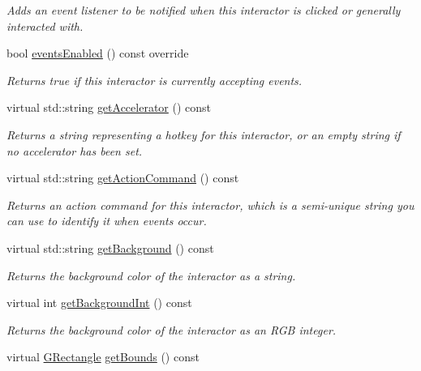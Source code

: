 \begin{DoxyCompactItemize}
\begin{DoxyCompactList}\small\item\em Adds an event listener to be notified when this interactor is clicked or generally interacted with. \end{DoxyCompactList}\item 
bool \mbox{\hyperlink{classsgl_1_1GInteractor_a597a370b592e3737d38d9d2f4e2031ea}{events\+Enabled}} () const override
\begin{DoxyCompactList}\small\item\em Returns true if this interactor is currently accepting events. \end{DoxyCompactList}\item 
virtual std\+::string \mbox{\hyperlink{classsgl_1_1GInteractor_a69f8d23ed8f207fbecad99960776e942}{get\+Accelerator}} () const
\begin{DoxyCompactList}\small\item\em Returns a string representing a hotkey for this interactor, or an empty string if no accelerator has been set. \end{DoxyCompactList}\item 
virtual std\+::string \mbox{\hyperlink{classsgl_1_1GInteractor_a94eb4276000c4fdfb508ce9e6317a82a}{get\+Action\+Command}} () const
\begin{DoxyCompactList}\small\item\em Returns an action command for this interactor, which is a semi-\/unique string you can use to identify it when events occur. \end{DoxyCompactList}\item 
virtual std\+::string \mbox{\hyperlink{classsgl_1_1GInteractor_a808e22cc1fdfbecf71ed8c64ef4600e0}{get\+Background}} () const
\begin{DoxyCompactList}\small\item\em Returns the background color of the interactor as a string. \end{DoxyCompactList}\item 
virtual int \mbox{\hyperlink{classsgl_1_1GInteractor_a9e827257a55cb8cf4d9de2ec6bcfd7a0}{get\+Background\+Int}} () const
\begin{DoxyCompactList}\small\item\em Returns the background color of the interactor as an R\+GB integer. \end{DoxyCompactList}\item 
virtual \mbox{\hyperlink{structsgl_1_1GRectangle}{G\+Rectangle}} \mbox{\hyperlink{classsgl_1_1GInteractor_a29e6ac35a0b48f491a4c88194cc5da3b}{get\+Bounds}} () const

\end{DoxyCompactItemize}
